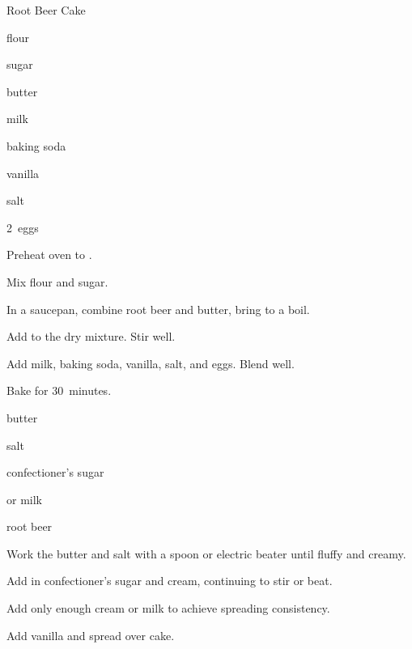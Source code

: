 \begin{recipe}{Root Beer Cake}{}{}

\begin{ingredients}
\item {} flour
\item {} sugar
\item {} 
\item {} butter
\item \C{\half} milk
\item {} baking soda
\item {} vanilla
\item \tp{\half} salt
\item 2~eggs
\end{ingredients}

\begin{directions}
\item Preheat oven to .
\item Mix flour and sugar.
\item In a saucepan, combine root beer and butter, bring to a boil.
\item Add to the dry mixture. Stir well.
\item Add milk, baking soda, vanilla, salt, and eggs. Blend well.
\item Bake for 30~minutes.
\end{directions}


\begin{ingredients}
\item \C{\quarter} butter
\item \tp{\eighth} salt
\item {} confectioner's sugar
\item {}  or milk
\item {} root beer
\end{ingredients}

\begin{directions}
\item Work the butter and salt with a spoon or electric beater until fluffy and creamy.
\item Add in confectioner's sugar and cream, continuing to stir or beat.
\item Add only enough cream or milk to achieve spreading consistency.
\item Add vanilla and spread over cake.
\end{directions}
\end{recipe}
